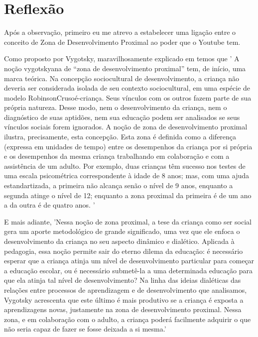 \section{Reflexão}  \label{Reflexão}

Após a observação, primeiro eu me atrevo a estabelecer uma ligação entre o conceito de Zona de Desenvolvimento Proximal ao poder que o Youtube tem.

Como proposto por Vygotsky, maravilhosamente explicado em  temos que '
A noção vygotskyana de “zona de desenvolvimento proximal” tem, de início, uma marca teórica. Na concepção sociocultural de desenvolvimento, a criança não deveria ser considerada isolada de seu contexto sociocultural, em uma espécie de modelo RobinsonCrusoé-criança. Seus vínculos com os outros fazem parte de sua própria natureza. Desse modo, nem o desenvolvimento da criança, nem o diagnóstico de suas aptidões, nem sua educação podem ser analisados se seus vínculos sociais forem ignorados. A noção de zona de desenvolvimento proximal ilustra, precisamente, esta concepção. Esta zona é definida como a diferença (expressa em unidades de tempo) entre os desempenhos da criança por si própria e os desempenhos da mesma criança trabalhando em colaboração e com a assistência de um adulto. Por exemplo, duas crianças têm sucesso nos testes de uma escala psicométrica correspondente à idade de 8 anos; mas, com uma ajuda estandartizada, a primeira não alcança senão o nível de 9 anos, enquanto a segunda atinge o nível de 12; enquanto a zona proximal da primeira é de um ano a da outra é de quatro anos. '

E mais adiante, 'Nessa noção de zona proximal, a tese da criança como ser social gera um aporte metodológico de grande significado, uma vez que ele enfoca o desenvolvimento da criança no seu aspecto dinâmico e dialético. Aplicada à pedagogia, essa noção permite sair do eterno dilema da educação: é necessário esperar que a criança atinja um nível de desenvolvimento particular para começar a educação escolar, ou é necessário submetê-la a uma determinada educação para que ela atinja tal nível de desenvolvimento? Na linha das ideias dialéticas das relações entre processos de aprendizagem e de desenvolvimento que analisamos, Vygotsky acrescenta que este último é mais produtivo se a criança é exposta a aprendizagens novas, justamente na zona de desenvolvimento proximal. Nessa zona, e em colaboração com o adulto, a criança poderá facilmente adquirir o que não seria capaz de fazer se fosse deixada a si mesma.'

